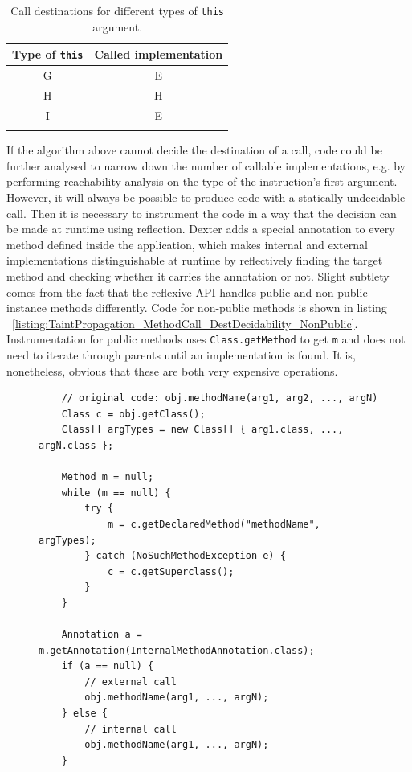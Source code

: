 \documentclass[12pt,twoside,notitlepage]{report}
\begin{document}
\begin{table}[h]
	\begin{center}
	\begin{tabular}{|c|c|}
		\firsthline
		\textbf{Type of} \verb$this$ & \textbf{Called implementation} \\
		\hline
		G & E \\
		H & H \\
		I & E \\
		\lasthline
	\end{tabular}
	\end{center}
	\caption{Call destinations for different types of \texttt{this} argument.}
	\label{table:TaintPropagation_DestDecision_ClassHierarchy_Destinations}
\end{table}

If the algorithm above cannot decide the destination of a call, code could be further analysed to narrow down the number of callable implementations, e.g. by performing reachability analysis on the type of the instruction's first argument. However, it will always be possible to produce code with a statically undecidable call. Then it is necessary to instrument the code in a way that the decision can be made at runtime using reflection. Dexter adds a special annotation to every method defined inside the application, which makes internal and external implementations distinguishable at runtime by reflectively finding the target method and checking whether it carries the annotation or not. Slight subtlety comes from the fact that the reflexive API handles public and non-public instance methods differently. Code for non-public methods is shown in listing ~\ref{listing:TaintPropagation_MethodCall_DestDecidability_NonPublic}. Instrumentation for public methods uses \verb$Class.getMethod$ to get \verb$m$ and does not need to iterate through parents until an implementation is found. It is, nonetheless, obvious that these are both very expensive operations. 

\begin{figure}
	\begin{lstlisting}
	// original code: obj.methodName(arg1, arg2, ..., argN)
	Class c = obj.getClass();
	Class[] argTypes = new Class[] { arg1.class, ..., argN.class };

	Method m = null;
	while (m == null) {
		try {
	 		m = c.getDeclaredMethod("methodName", argTypes);
	 	} catch (NoSuchMethodException e) {
	 		c = c.getSuperclass();
	 	}
	}

	Annotation a = m.getAnnotation(InternalMethodAnnotation.class);
	if (a == null) {
		// external call
		obj.methodName(arg1, ..., argN);
	} else {
		// internal call
		obj.methodName(arg1, ..., argN);
	}
	\end{lstlisting}
\end{figure}
\end{document}
